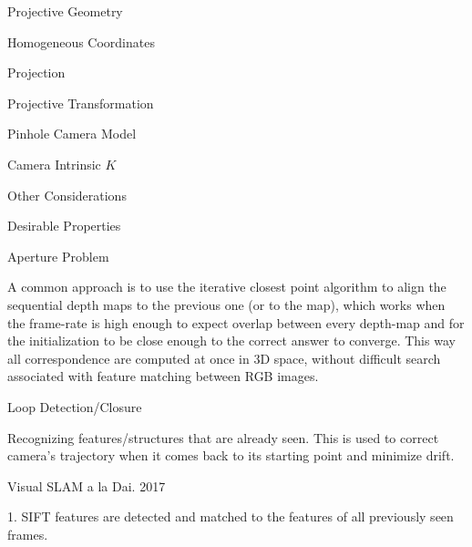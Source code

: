 \begin{section}
\begin{subsubsection}
\begin{subsubsection}
\begin{subsubsection}
\begin{section}{Projective Geometry}
\begin{subsection}{Homogeneous Coordinates}
\begin{subsubsection}
{\begin{subsubsection}{Projection}
\begin{subsubsection}{Projective Transformation}
\begin{subsection}
\begin{subsubsection}
\begin{subsubsection}
\begin{subsubsection}
{\begin{subsubsection}
\begin{subsection}
\begin{subsection} {Pinhole Camera Model}
\begin{subsection} {Camera Intrinsic $K$}
\begin{subsection}
\begin{subsection}
\begin{subsubsection}{Other Considerations}
{\begin{subsection}
\begin{subsubsection}{Desirable Properties}
\begin{section}
\begin{subsection}
\begin{subsection}
\begin{subsection}
\begin{section}
\begin{subsection}
\begin{subsubsection}
\begin{subsubsection}
\begin{subsection}
\begin{section}
\begin{subsection}
\begin{subsubsection}{Aperture Problem}
\begin{subsubsection}
{\begin{section}
\begin{subsubsection}
\begin{subsubsection}
\begin{subsubsection}
\begin{subsection}
\begin{subsection}
\begin{subsection}
\begin{subsection}
\begin{subsection}
\begin{subsection}
\begin{subsection}
\begin{subsubsection}
{\begin{subsubsection}
{\begin{subsubsection}
\begin{section}
\begin{section}
\begin{section}
\begin{subsubsection}
A common approach is to use the iterative closest point algorithm to align the sequential depth maps to the previous one (or to the map), which works when the frame-rate is high enough to expect overlap between every depth-map and for the initialization to be close enough to the correct answer to converge. This way all correspondence are computed at once in 3D space, without difficult search associated with feature matching between RGB images.

\begin{subsubsection}{Loop Detection/Closure}

Recognizing features/structures that are already seen. This is used to correct camera's trajectory when it comes back to its starting point and minimize drift.

\begin{subsubsection}{Visual SLAM a la Dai. 2017}

1. SIFT features are detected and matched to the features of all previously seen frames. 


\end{subsubsection}
\end{subsubsection}
\end{subsubsection}
\end{section}
\end{section}
\end{section}
\end{subsubsection}}
\end{subsubsection}}
\end{subsubsection}
\end{subsection}
\end{subsection}
\end{subsection}
\end{subsection}
\end{subsection}
\end{subsection}
\end{subsection}
\end{subsubsection}
\end{subsubsection}
\end{subsubsection}
\end{section}}
\end{subsubsection}
\end{subsubsection}
\end{subsection}
\end{section}
\end{subsection}
\end{subsubsection}
\end{subsubsection}
\end{subsection}
\end{section}
\end{subsection}
\end{subsection}
\end{subsection}
\end{section}
\end{subsubsection}
\end{subsection}}
\end{subsubsection}
\end{subsection}
\end{subsection}
\end{subsection}
\end{subsection}
\end{subsection}
\end{subsubsection}}
\end{subsubsection}
\end{subsubsection}
\end{subsubsection}
\end{subsection}
\end{subsubsection}
\end{subsubsection}}
\end{subsubsection}
\end{subsection}
\end{section}
\end{subsubsection}
\end{subsubsection}
\end{subsubsection}
\end{section}
